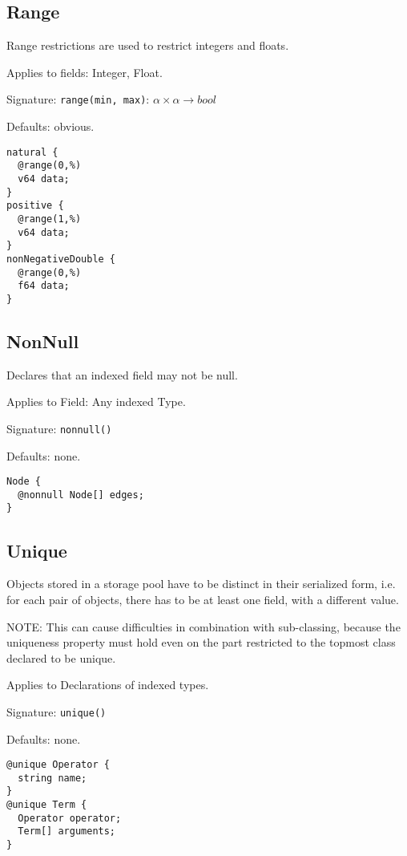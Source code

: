 \documentclass[a4paper,10pt]{article}
\begin{document}
\subsection*{Range}
Range restrictions are used to restrict integers and floats.

Applies to fields: Integer, Float.

Signature: \verb/range(min, max)/: $\alpha \times \alpha → bool$

Defaults: obvious.

\begin{lstlisting}[label=rangeExample,caption=Examples,language=skill]
natural {
  @range(0,%)
  v64 data;
}
positive {
  @range(1,%)
  v64 data;
}
nonNegativeDouble {
  @range(0,%)
  f64 data;
}
\end{lstlisting}

\subsection*{NonNull}
Declares that an indexed field may not be null.

Applies to Field: Any indexed Type.

Signature: \verb/nonnull()/

Defaults: none.

\begin{lstlisting}[label=nonnullExample,caption=Examples,language=skill]
Node {
  @nonnull Node[] edges;
}
\end{lstlisting}


\subsection*{Unique}
Objects stored in a storage pool have to be distinct in their serialized form, i.e. for each pair of objects, there has to be at least one field, with a different value.

NOTE: This can cause difficulties in combination with sub-classing, because the uniqueness property must hold even on the part restricted to the topmost class declared to be unique.

Applies to Declarations of indexed types.

Signature: \verb/unique()/

Defaults: none.

\begin{lstlisting}[label=uniqueExample,caption=Examples,language=skill]
@unique Operator {
  string name;
}
@unique Term {
  Operator operator;
  Term[] arguments;
}
\end{lstlisting}
\end{document}
